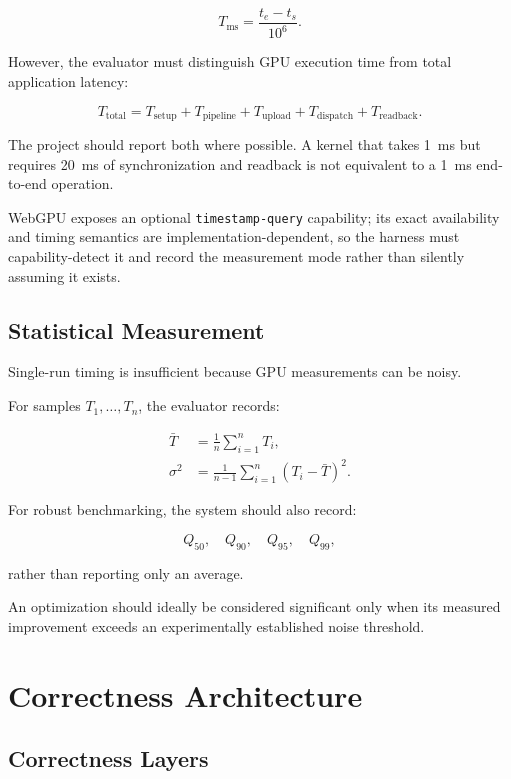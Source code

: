 \documentclass[11pt,a4paper,oneside]{report}
\begin{document}
\begin{equation}
T_{\mathrm{ms}}
=
\frac{t_e-t_s}{10^6}.
\end{equation}

However, the evaluator must distinguish GPU execution time from total application latency:

\begin{equation}
T_{\mathrm{total}}
=
T_{\mathrm{setup}}+
T_{\mathrm{pipeline}}+
T_{\mathrm{upload}}+
T_{\mathrm{dispatch}}+
T_{\mathrm{readback}}.
\end{equation}

The project should report both where possible. A kernel that takes \SI{1}{ms} but requires
\SI{20}{ms} of synchronization and readback is not equivalent to a \SI{1}{ms} end-to-end operation.

WebGPU exposes an optional \texttt{timestamp-query} capability; its exact availability and timing
semantics are implementation-dependent, so the harness must capability-detect it and record the
measurement mode rather than silently assuming it exists. 

\section{Statistical Measurement}

Single-run timing is insufficient because GPU measurements can be noisy.

For samples $T_1,\ldots,T_n$, the evaluator records:

\begin{align}
\bar{T}&=\frac{1}{n}\sum_{i=1}^{n}T_i,\\
\sigma^2&=\frac{1}{n-1}\sum_{i=1}^{n}(T_i-\bar{T})^2.
\end{align}

For robust benchmarking, the system should also record:

\[
Q_{50},\quad Q_{90},\quad Q_{95},\quad Q_{99},
\]

rather than reporting only an average.

An optimization should ideally be considered significant only when its measured improvement
exceeds an experimentally established noise threshold.

\chapter{Correctness Architecture}

\section{Correctness Layers}
\end{document}
